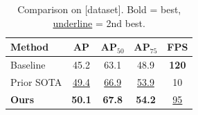 \begin{table}[t]
  \centering
  \caption{Comparison on [dataset]. Bold = best, \underline{underline} = 2nd best.}
  \label{tab:main}
  \begin{tabular}{l cccc}
    \toprule
    Method & AP & AP$_{50}$ & AP$_{75}$ & FPS \\
    \midrule
    Baseline      & 45.2 & 63.1 & 48.9 & \textbf{120} \\
    Prior SOTA    & \underline{49.4} & \underline{66.9} & \underline{53.9} & 10 \\
    \textbf{Ours} & \textbf{50.1} & \textbf{67.8} & \textbf{54.2} & \underline{95} \\
    \bottomrule
  \end{tabular}
\end{table}

